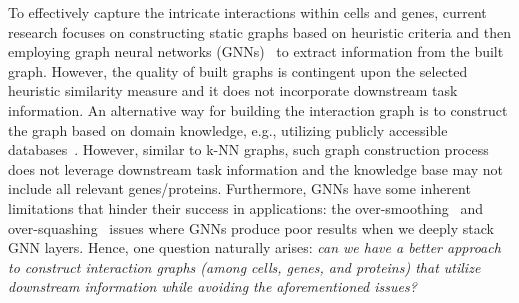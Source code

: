

To effectively capture the intricate interactions within cells and genes, current research focuses on constructing static graphs based on heuristic criteria and then employing graph neural networks (GNNs)~\cite{kipf2016semi, velickovic2017graph, ma2021deep} to extract information from the built graph. 
However, the quality of built graphs is contingent upon the selected heuristic similarity measure and it does not incorporate downstream task information.
An alternative way for building the interaction graph is to construct the graph based on domain knowledge, e.g., utilizing publicly accessible databases~\cite{wen2022graph}. %
However, similar to k-NN graphs, such graph construction process does not leverage downstream task information and the knowledge base may not include all relevant genes/proteins. Furthermore, GNNs have some inherent limitations that hinder their success in applications: the over-smoothing~\cite{kreuzer2021rethinking} and over-squashing~\cite{alon2021on} issues where GNNs produce poor results when we deeply stack GNN layers.
Hence, one question naturally arises: \textit{can we have a better approach to construct interaction graphs (among cells, genes, and proteins) that utilize downstream information while avoiding the aforementioned issues?}

